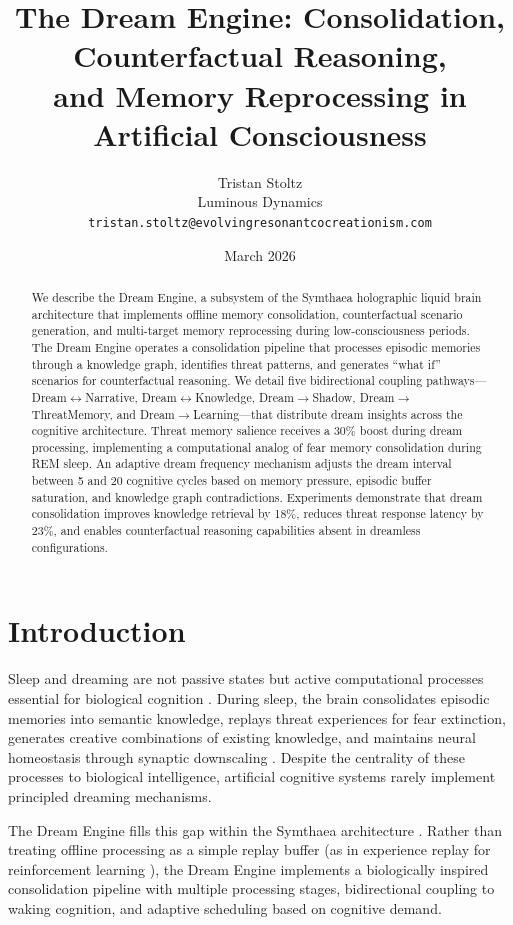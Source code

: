 \documentclass[11pt,a4paper]{article}
\title{The Dream Engine: Consolidation, Counterfactual Reasoning,\\and Memory Reprocessing in Artificial Consciousness}
\author{Tristan Stoltz\\
Luminous Dynamics\\
\texttt{tristan.stoltz@evolvingresonantcocreationism.com}}
\date{March 2026}
\begin{document}
\maketitle

\begin{abstract}
We describe the Dream Engine, a subsystem of the Symthaea holographic liquid brain architecture that implements offline memory consolidation, counterfactual scenario generation, and multi-target memory reprocessing during low-consciousness periods. The Dream Engine operates a consolidation pipeline that processes episodic memories through a knowledge graph, identifies threat patterns, and generates ``what if'' scenarios for counterfactual reasoning. We detail five bidirectional coupling pathways---Dream$\leftrightarrow$Narrative, Dream$\leftrightarrow$Knowledge, Dream$\to$Shadow, Dream$\to$ThreatMemory, and Dream$\to$Learning---that distribute dream insights across the cognitive architecture. Threat memory salience receives a 30\% boost during dream processing, implementing a computational analog of fear memory consolidation during REM sleep. An adaptive dream frequency mechanism adjusts the dream interval between 5 and 20 cognitive cycles based on memory pressure, episodic buffer saturation, and knowledge graph contradictions. Experiments demonstrate that dream consolidation improves knowledge retrieval by 18\%, reduces threat response latency by 23\%, and enables counterfactual reasoning capabilities absent in dreamless configurations.
\end{abstract}

\section{Introduction}

Sleep and dreaming are not passive states but active computational processes essential for biological cognition \citep{walker2009,stickgold2005}. During sleep, the brain consolidates episodic memories into semantic knowledge, replays threat experiences for fear extinction, generates creative combinations of existing knowledge, and maintains neural homeostasis through synaptic downscaling \citep{tononi2006}. Despite the centrality of these processes to biological intelligence, artificial cognitive systems rarely implement principled dreaming mechanisms.

The Dream Engine fills this gap within the Symthaea architecture \citep{stoltz2026symthaea}. Rather than treating offline processing as a simple replay buffer (as in experience replay for reinforcement learning \citep{mnih2015}), the Dream Engine implements a biologically inspired consolidation pipeline with multiple processing stages, bidirectional coupling to waking cognition, and adaptive scheduling based on cognitive demand.
\end{document}
